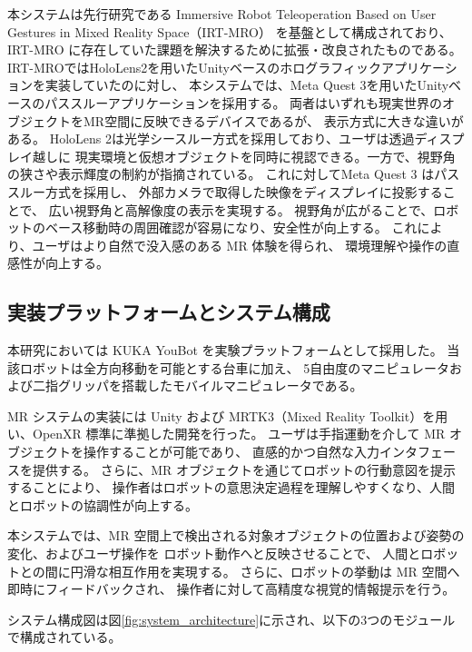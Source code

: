 \documentclass[../../main.tex]{subfiles} %
\begin{document}
本システムは先行研究である Immersive Robot Teleoperation Based on User Gestures in Mixed Reality Space（IRT-MRO）
を基盤として構成されており、IRT-MRO に存在していた課題を解決するために拡張・改良されたものである。
IRT-MROではHoloLens2を用いたUnityベースのホログラフィックアプリケーションを実装していたのに対し、
本システムでは、Meta Quest 3を用いたUnityベースのパススルーアプリケーションを採用する。
両者はいずれも現実世界のオブジェクトをMR空間に反映できるデバイスであるが、
表示方式に大きな違いがある。
HoloLens 2は光学シースルー方式を採用しており、ユーザは透過ディスプレイ越しに
現実環境と仮想オブジェクトを同時に視認できる。一方で、視野角の狭さや表示輝度の制約が指摘されている。
これに対してMeta Quest 3 はパススルー方式を採用し、
外部カメラで取得した映像をディスプレイに投影することで、
広い視野角と高解像度の表示を実現する。
視野角が広がることで、ロボットのベース移動時の周囲確認が容易になり、安全性が向上する。
これにより、ユーザはより自然で没入感のある MR 体験を得られ、
環境理解や操作の直感性が向上する。


\subsection{実装プラットフォームとシステム構成}
本研究においては KUKA YouBot を実験プラットフォームとして採用した。
当該ロボットは全方向移動を可能とする台車に加え、
5自由度のマニピュレータおよび二指グリッパを搭載したモバイルマニピュレータである。

MR システムの実装には Unity および MRTK3（Mixed Reality Toolkit）を用い、OpenXR 標準に準拠した開発を行った。
ユーザは手指運動を介して MR オブジェクトを操作することが可能であり、
直感的かつ自然な入力インタフェースを提供する。
さらに、MR オブジェクトを通じてロボットの行動意図を提示することにより、
操作者はロボットの意思決定過程を理解しやすくなり、人間とロボットの協調性が向上する。

本システムでは、MR 空間上で検出される対象オブジェクトの位置および姿勢の変化、およびユーザ操作を
ロボット動作へと反映させることで、
人間とロボットとの間に円滑な相互作用を実現する。
さらに、ロボットの挙動は MR 空間へ即時にフィードバックされ、
操作者に対して高精度な視覚的情報提示を行う。

システム構成図は図\ref{fig:system_architecture}に示され、以下の3つのモジュールで構成されている。
\end{document}
